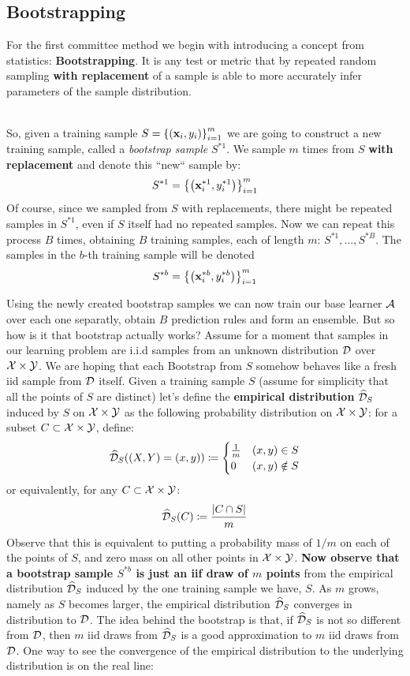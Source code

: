 \subsection{Bootstrapping} \label{bootstrap}
For the first committee method we begin with introducing a concept from statistics: \textbf{Bootstrapping}. It is any test or metric that by repeated random sampling \textbf{with replacement} of a sample is able to more accurately infer parameters of the sample distribution.
~\\

~\\
So, given a training sample $S=\left\{\left(\mathbf{x}_i,y_i\right)\right\}^m_{i=1}$ we are going to construct a new training sample, called a \textit{bootstrap sample} $S^{*1}$. We sample $m$ times from $S$ \textbf{with replacement} and denote this ``new`` sample by: $$ S^{*1}=\left\{\left(\mathbf{x}_i^{*1},y_i^{*1}\right)\right\}^m_{i=1} $$
Of course, since we sampled from $S$ with replacements, there might be repeated samples in $S^{*1}$, even if $S$ itself had no repeated samples. Now we can repeat this process $B$ times, obtaining $B$ training samples, each of length $m$: $S^{*1},\ldots,S^{*B}$. The samples in the $b$-th training sample will be denoted $$ S^{*b}=\left\{\left(\mathbf{x}_i^{*b},y_i^{*b}\right)\right\}^m_{i=1} $$

Using the newly created bootstrap samples we can now train our base learner $\mathcal{A}$ over each one separatly, obtain $B$ prediction rules and form an ensemble. But so how is it that bootstrap actually works? Assume for a moment that samples in our learning problem are i.i.d samples from an unknown distribution $\mathcal{D}$ over $\mathcal{X}\times\mathcal{Y}$. We are hoping that each Bootstrap from $S$ somehow behaves like a fresh iid sample from $\mathcal{D}$ itself. Given a training sample $S$ (assume for simplicity that all the points of $S$ are distinct) let's define the \textbf{empirical distribution} $\widehat{\mathcal{D}}_S$ induced by $S$ on $\mathcal{X}\times\mathcal{Y}$ as the following probability distribution
on $\mathcal{X}\times\mathcal{Y}$: for a subset $C\subset\mathcal{X}\times\mathcal{Y}$, define:
$$
\widehat{\mathcal{D}}_S( (X,Y)=(x,y) ) \coloneqq 
\begin{cases}
\frac{1}{m} & (x,y)\in S\\ 
0 & (x,y) \notin S
\end{cases}
$$
or equivalently, for any $C\subset\mathcal{X}\times\mathcal{Y}$:
$$
\widehat{\mathcal{D}}_S(C)\coloneqq \frac{| C \cap S |}{m}	
$$
Observe that this is equivalent to putting a probability mass of $1/m$ on each of the points of $S$, and zero mass on all other points in $\mathcal{X}\times\mathcal{Y}$. \textbf{Now observe that a bootstrap sample $S^{*b}$ is just an iif draw of $m$ points} from the empirical distribution $\widehat{\mathcal{D}}_S$ induced by the one training sample we have, $S$. As $m$ grows, namely as $S$ becomes larger, the empirical distribution $\widehat{\mathcal{D}}_S$ converges in distribution to $\mathcal{D}$. The idea behind the bootstrap is that, if $\widehat{\mathcal{D}}_S$ is not so different from $\mathcal{D}$, then $m$ iid draws from $\widehat{\mathcal{D}}_S$ is a good approximation to $m$ iid draws from $\mathcal{D}$. One way to see the convergence of the empirical distribution to the underlying distribution is on the real line:

